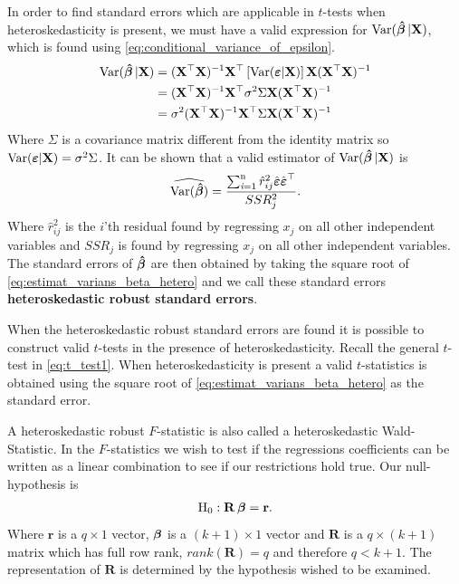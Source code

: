 In order to find standard errors which are applicable in $t$-tests when heteroskedasticity is present, we must have a valid expression for $\operatorname{\text{Var}}(\operatorname{\boldsymbol{\hat{\beta}}}|\textbf{X})$, which is found using \eqref{eq:conditional_variance_of_epsilon}. 
\begin{align*}
   \operatorname{\text{Var}}(\operatorname{\boldsymbol{\hat{\beta}}}|\mathbf{X}) &= (\mathbf{X}^\top\mathbf{X})^{-1}\mathbf{X}^\top\left[ \operatorname{\text{Var}}(\boldsymbol{\varepsilon} | \mathbf{X}) \right] \mathbf{X}(\mathbf{X}^\top\mathbf{X})^{-1}\\
   &= (\mathbf{X}^\top \mathbf{X})^{-1}\mathbf{X}^\top \sigma^2 \Sigma \mathbf{X}(\mathbf{X}^\top \mathbf{X})^{-1}\\
   &= \sigma^2 (\mathbf{X}^\top \mathbf{X})^{-1}\mathbf{X}^\top \Sigma \mathbf{X} (\mathbf{X}^\top \mathbf{X})^{-1}
\end{align*}
Where $\Sigma$ is a covariance matrix different from the identity matrix so $\operatorname{\text{Var}}(\boldsymbol{\varepsilon}|\textbf{X}) = \sigma^2 \Sigma$. It can be shown that a valid estimator of $\operatorname{\text{Var}}(\operatorname{\boldsymbol{\hat{\beta}}}|\textbf{X})$ is
\begin{align}\label{eq:estimat_varians_beta_hetero}
    \widehat{\operatorname{\text{Var}}(\operatorname{\boldsymbol{\hat{\beta}}})} = \dfrac{\operatorname{\sum_{\textit{i}=1}^n} \hat{r}^2_{ij} \hat{\boldsymbol{\varepsilon}}\hat{\boldsymbol{\varepsilon}}^\top}{SSR_j^2}. 
\end{align}
Where $\hat{r}^2_{ij}$ is the $i$'th residual found by regressing $x_j$ on all other independent variables and $SSR_j$ is found by regressing $x_j$ on all other independent variables. 
The standard errors of $\operatorname{\boldsymbol{\hat{\beta}}}$ are then obtained by taking the square root of \eqref{eq:estimat_varians_beta_hetero} and we call these standard errors \textbf{heteroskedastic robust standard errors}. 

When the heteroskedastic robust standard errors are found it is possible to construct valid $t$-tests in the presence of heteroskedasticity. 
Recall the general $t$-test in \eqref{eq:t_test1}. When heteroskedasticity is present a valid $t$-statistics is obtained using the square root of \eqref{eq:estimat_varians_beta_hetero} as the standard error. 

A heteroskedastic robust $F$-statistic is also called a heteroskedastic Wald-Statistic. In the $F$-statistics we wish to test if the regressions coefficients can be written as a linear combination to see if our restrictions hold true. Our null-hypothesis is
\begin{align*}
    \mathrm{H}_0 : \mathbf{R}\operatorname{\boldsymbol{\beta}} = \mathbf{r}. 
\end{align*}
Where $\mathbf{r}$ is a $q \times 1$ vector, $\operatorname{\boldsymbol{\beta}}$ is a $(k+1) \times 1$ vector and $\mathbf{R}$ is a $q \times (k+1)$ matrix which has full row rank, $rank(\mathbf{R}) = q$ and therefore $q < k+1$. The representation of $\mathbf{R}$ is determined by the hypothesis wished to be examined. 

